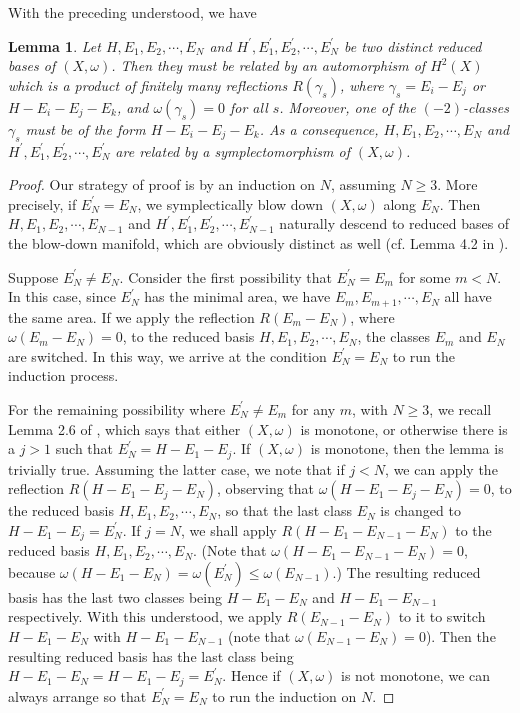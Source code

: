 \documentclass[11pt]{amsart}
\theoremstyle{plain}
\numberwithin{theorem}{section}
\newtheorem{lemma}[theorem]{Lemma}
\theoremstyle{definition}
\begin{document}
With the preceding understood, we have 

\begin{lemma}
Let $H,E_1,E_2,\cdots,E_N$ and $H^\prime,E_1^\prime,E_2^\prime,\cdots,E_N^\prime$ be two
distinct reduced bases of $(X,\omega)$. Then they must be related by an automorphism of $H^2(X)$
which is a product of finitely many reflections $R(\gamma_s)$, where $\gamma_s=E_i-E_j$ or 
$H-E_i-E_j-E_k$, and $\omega(\gamma_s)=0$ for all $s$. Moreover, one of the $(-2)$-classes $\gamma_s$
must be of the form $H-E_i-E_j-E_k$. As a consequence, $H,E_1,E_2,\cdots,E_N$ and $H^\prime,E_1^\prime,E_2^\prime,\cdots,E_N^\prime$ are related by a symplectomorphism of
$(X,\omega)$.
\end{lemma}

\begin{proof}
Our strategy of proof is by an induction on $N$, assuming $N\geq 3$. More precisely, if $E_N^\prime=E_N$, we symplectically blow down $(X,\omega)$ along $E_N$. Then $H,E_1,E_2,\cdots,E_{N-1}$ and $H^\prime,E_1^\prime,E_2^\prime,\cdots,E_{N-1}^\prime$ 
naturally descend to reduced bases of the 
blow-down manifold, which are obviously distinct as well (cf. Lemma 4.2 in \cite{C1}).

Suppose $E_N^\prime\neq E_N$. Consider the first possibility that $E_N^\prime=E_m$ for some 
$m<N$. In this case, since  $E_N^\prime$ has the minimal area, we have $E_m, E_{m+1}, \cdots,E_N$
all have the same area. If we apply the reflection $R(E_m-E_N)$, where $\omega(E_m-E_N)=0$, 
to the reduced basis $H,E_1,E_2,\cdots,E_N$, the classes $E_m$ and $E_N$ are switched. In this way, we arrive at the condition $E_N^\prime=E_N$ to run the induction process.

For the remaining possibility where $E_N^\prime\neq E_m$ for any $m$, with $N\geq 3$,
we recall Lemma 2.6 of \cite{CLW}, which says that either $(X,\omega)$ is monotone, or otherwise there is a $j>1$ such that $E_N^\prime=H-E_1-E_j$. If $(X,\omega)$ is monotone, then the lemma is trivially true. Assuming the latter case, we note that if $j<N$, we can apply the reflection 
$R(H-E_1-E_j-E_N)$, observing that $\omega(H-E_1-E_j-E_N)=0$, to the reduced basis $H,E_1,E_2,\cdots,E_N$, so that the last class $E_N$ is changed to $H-E_1-E_j=E_N^\prime$. If $j=N$, we shall apply $R(H-E_1-E_{N-1}-E_N)$ to the reduced basis $H,E_1,E_2,\cdots,E_N$. 
(Note that $\omega(H-E_1-E_{N-1}-E_N)=0$, 
because $\omega(H-E_1-E_N)=\omega(E_N^\prime)\leq \omega(E_{N-1})$.)
The resulting reduced basis has the last two classes being $H-E_1-E_N$ and $H-E_1-E_{N-1}$
respectively. With this understood, we apply $R(E_{N-1}-E_N)$ to it to switch $H-E_1-E_N$ with 
$H-E_1-E_{N-1}$ (note that $\omega(E_{N-1}-E_N)=0$). Then the resulting reduced basis has 
the last class being $H-E_1-E_N=H-E_1-E_j=E_N^\prime$. Hence if $(X,\omega)$ is not monotone, we can always arrange so that $E_N^\prime=E_N$ to run the induction on $N$.


\end{proof}
\end{document}
